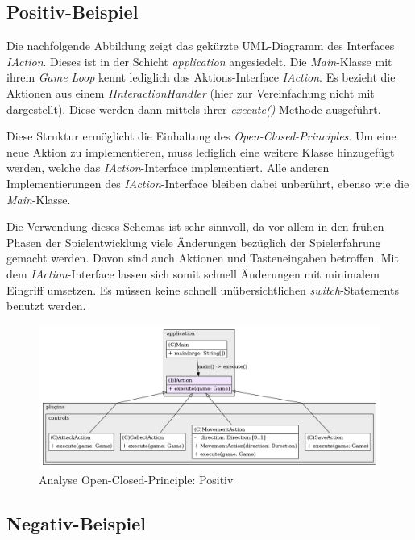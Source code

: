 \subsection{Positiv-Beispiel}
Die nachfolgende Abbildung zeigt das gekürzte UML-Diagramm des Interfaces
\textit{IAction}. Dieses ist in der Schicht \textit{application}
angesiedelt. Die \textit{Main}-Klasse mit ihrem \textit{Game Loop}
kennt lediglich das Aktions-Interface \textit{IAction}. Es bezieht
die Aktionen aus einem \textit{IInteractionHandler} (hier zur
Vereinfachung nicht mit dargestellt). Diese werden dann mittels
ihrer \textit{execute()}-Methode ausgeführt. 

Diese Struktur ermöglicht die Einhaltung des
\textit{Open-Closed-Principles}. Um eine neue Aktion zu implementieren,
muss lediglich eine weitere Klasse hinzugefügt werden, welche das 
\textit{IAction}-Interface implementiert. Alle anderen Implementierungen
des \textit{IAction}-Interface bleiben dabei unberührt, ebenso wie die
\textit{Main}-Klasse.

Die Verwendung dieses Schemas ist sehr sinnvoll, da vor allem in den
frühen Phasen der Spielentwicklung viele Änderungen bezüglich der
Spielerfahrung gemacht werden. Davon sind auch Aktionen und
Tasteneingaben betroffen. Mit dem \textit{IAction}-Interface lassen
sich somit schnell Änderungen mit minimalem Eingriff umsetzen. Es
müssen keine schnell unübersichtlichen \textit{switch}-Statements
benutzt werden. 

\vspace{0.2cm}
\begin{figure}[H]
    \centering
    \includegraphics[width=1\linewidth]{Bilder/Visualisierung/IAction_structure.png}
    \caption{Analyse Open-Closed-Principle: Positiv}
\end{figure}

\subsection{Negativ-Beispiel}

